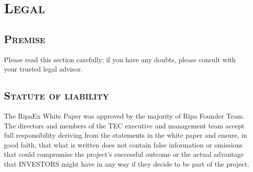 \documentclass[11pt,fleqn]{book} %
\begin{document}
\chapter{\textsc{Legal}}
\begin{scriptsize}
	{\scshape
		\section{\textsc{Premise}}
		Please read this section carefully; if you have any doubts,
		please consult with your trusted legal advisor.
		\section{\textsc{Statute of liability}} 
		The RipaEx White Paper was approved by the majority of Ripa Founder Team.
		The directors and members of the TEC executive and
		management team accept full responsibility deriving
		from the statements in the white paper and ensure, in
		good faith, that what is written does not contain false
		information or omissions that could compromise the
		project’s successful outcome or the actual advantage that
		INVESTORS might have in any way if they decide to be
		part of the project.
}
\end{scriptsize}
\end{document}
